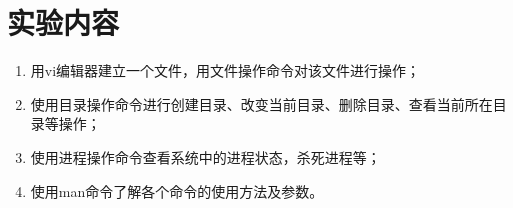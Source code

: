 \documentclass[cs4size,a4paper,nofonts]{ctexart}
\begin{document}

\setcounter{part}{0}


\iffalse
\section{实验目的}
\begin{enumerate}
\item 熟悉Linux操作系统的基本操作命令；
\item 通过在Linux环境下对进程的基本操作，认识进程并区分与程序的区别。
\end{enumerate}

\section{实验环境}
一台装有Linux操作系统（Fedora 7），至少具有256M内存的微机。

\section{预备知识}
\begin{enumerate}
\item vi编辑器的使用
\item 系统管理命令\\
login, logout, man
\item 文件操作命令\\
ls, cat, cp, mv , rm,
\item 目录操作命令\\
cd, mkdir, rmdir, pwd
\item 进程操作命令\\
ps, kill, pstree
\end{enumerate}
\fi

\section{实验内容}
\begin{enumerate}[label={(\arabic*)}]
\item 用vi编辑器建立一个文件，用文件操作命令对该文件进行操作；
\item 使用目录操作命令进行创建目录、改变当前目录、删除目录、查看当前所在目录等操作；
\item 使用进程操作命令查看系统中的进程状态，杀死进程等；
\item 使用man命令了解各个命令的使用方法及参数。
\end{enumerate}
\end{document}
